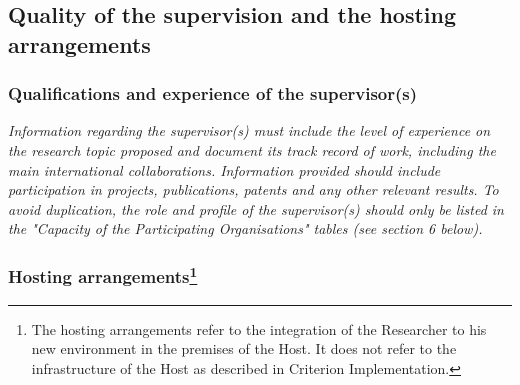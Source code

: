 \documentclass[a4paper,11pt]{article}
\begin{document}
\subsection{Quality of the supervision and the hosting arrangements}
\label{sec:supervision}


\subsubsection*{Qualifications and experience of the supervisor(s)}

{\em
Information regarding the supervisor(s) must include the level of experience on the research topic proposed and document its track record of work, including the main international collaborations. Information provided should include participation in projects, publications, patents and any other relevant results.
To avoid duplication, the role and profile of the supervisor(s) should only be listed in the "Capacity of the Participating Organisations" tables (see section 6 below). 
}

\subsubsection*{Hosting arrangements\footnote{The hosting arrangements refer to the integration of the Researcher to his new environment in the premises of the Host. It does not refer to the infrastructure of the Host as described in Criterion Implementation.}}


%
\end{document}
